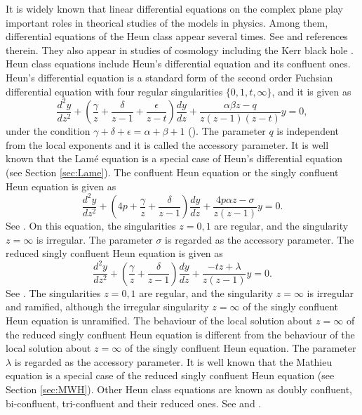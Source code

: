 \documentclass[12pt]{amsart}
\numberwithin{equation}{section}
\theoremstyle{definition}
\theoremstyle{remark}
\begin{document}
It is widely known that linear differential equations on the complex plane play important roles in theorical studies of the models in physics.
Among them, differential equations of the Heun class appear several times.
See \cite{SL,Tak5} and references therein.
They also appear in studies of cosmology including the Kerr black hole \cite{STU}.
Heun class equations include Heun's differential equation and its confluent ones.
Heun's differential equation is a standard form of the second order Fuchsian differential equation with four regular singularities $\{ 0,1,t,\infty \}$, and it is given as
\begin{equation}
\frac{d^2y}{dz^2} + \left( \frac{\gamma}{z}+\frac{\delta }{z-1}+\frac{\epsilon}{z-t}\right) \frac{dy}{dz} +\frac{\alpha \beta z -q}{z(z-1)(z-t)} y=0,
\label{eq:Heun}
\end{equation}
under the condition $\gamma +\delta +\epsilon =\alpha +\beta +1 $ (\cite{Ron,SL}).
The parameter $q$ is independent from the local exponents and it is called the accessory parameter.
It is well known that the Lam\'e equation is a special case of Heun's differential equation (see Section \ref{sec:Lame}).
The confluent Heun equation or the singly confluent Heun equation is given as
\begin{equation}
\frac{d^2y}{dz^2} + \left( 4p+ \frac{\gamma}{z}+\frac{\delta }{z-1} \right) \frac{dy}{dz} +\frac{4 p \alpha z - \sigma }{z(z-1)} y=0 . 
\end{equation}
See \cite[pp.~94]{Ron}.
On this equation, the singularities $z=0,1$ are regular, and the singularity $z= \infty $ is irregular.
The parameter $ \sigma$ is regarded as the accessory parameter.
The reduced singly confluent Heun equation is given as
\begin{equation}
\frac{d^2y}{dz^2} + \left( \frac{\gamma}{z}+\frac{\delta }{z-1} \right) \frac{dy}{dz} +\frac{-t z + \lambda }{z(z-1)} y=0 .
\label{eq:redsingconfHeun0}
\end{equation}
See \cite[pp.~106]{SL}.
The singularities $z=0,1$ are regular, and the singularity $z= \infty $ is irregular and ramified, although the irregular singularity $z= \infty $ of the singly confluent Heun equation is unramified.
The behaviour of the local solution about $z=\infty $ of the reduced singly confluent Heun equation is different from the behaviour of the local solution about $z=\infty $ of the singly confluent Heun equation.
The parameter $ \lambda $ is regarded as the accessory parameter.
It is well known that the Mathieu equation is a special case of the reduced singly confluent Heun equation (see Section \ref{sec:MWH}).
Other Heun class equations are known as doubly confluent, bi-confluent, tri-confluent and their reduced ones.
See \cite{Ron} and \cite{SL}.
\end{document}
